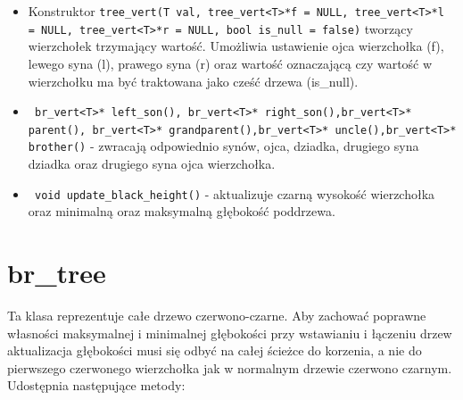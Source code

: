 \documentclass[declaration,shortabstract]{iithesis}
\theoremstyle{thm}
\theoremstyle{remark}
\theoremstyle{plain}
\theoremstyle{plain}
\theoremstyle{plain}
\begin{document}
\begin{itemize}

\item{Konstruktor \texttt{tree\_vert(T val, tree\_vert<T>*f = NULL, tree\_vert<T>*l = NULL, tree\_vert<T>*r = NULL, bool is\_null = false)} tworzący wierzchołek trzymający wartość. Umożliwia ustawienie ojca wierzchołka (f), lewego syna (l), prawego syna (r) oraz wartość oznaczającą czy wartość w wierzchołku ma być traktowana jako cześć drzewa (is\_null).}

\item{\texttt{  br\_vert<T>* left\_son(), br\_vert<T>* right\_son(),br\_vert<T>* parent(), br\_vert<T>* grandparent(),br\_vert<T>* uncle(),br\_vert<T>* brother()} - zwracają odpowiednio synów, ojca, dziadka, drugiego syna dziadka oraz drugiego syna ojca wierzchołka. }
    
\item{\texttt{ void update\_black\_height()} - aktualizuje czarną wysokość wierzchołka oraz minimalną oraz maksymalną głębokość poddrzewa.}

\end{itemize}

\section{br\_tree}

Ta klasa reprezentuje całe drzewo czerwono-czarne. Aby zachować poprawne własności maksymalnej i minimalnej głębokości przy wstawianiu i łączeniu drzew aktualizacja głębokości musi się odbyć na całej ścieżce do korzenia, a nie do pierwszego czerwonego wierzchołka jak w normalnym drzewie czerwono czarnym. Udostępnia następujące metody: 
\end{document}
